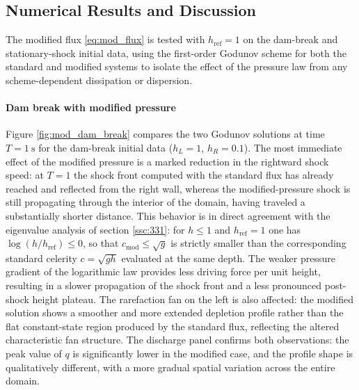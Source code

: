 

\subsection{Numerical Results and Discussion}
\label{ssc:332}

The modified flux \eqref{eq:mod_flux} is tested with \( h_{\mathrm{ref}} = 1 \) on the dam-break and stationary-shock initial data, using the first-order Godunov scheme for both the standard and modified systems to isolate the effect of the pressure law from any scheme-dependent dissipation or dispersion.

\paragraph{Dam break with modified pressure}
Figure \ref{fig:mod_dam_break} compares the two Godunov solutions at time \( T = \SI{1}{\second} \) for the dam-break initial data (\( h_L = 1 \), \( h_R = 0.1 \)). The most immediate effect of the modified pressure is a marked reduction in the rightward shock speed: at \( T = 1 \) the shock front computed with the standard flux has already reached and reflected from the right wall, whereas the modified-pressure shock is still propagating through the interior of the domain, having traveled a substantially shorter distance. This behavior is in direct agreement with the eigenvalue analysis of section \ref{ssc:331}: for \( h \leq 1 \) and \( h_{\mathrm{ref}} = 1 \) one has \( \log(h/h_{\mathrm{ref}}) \leq 0 \), so that \( c_{\mathrm{mod}} \leq \sqrt{g} \) is strictly smaller than the corresponding standard celerity \( c = \sqrt{gh} \) evaluated at the same depth. The weaker pressure gradient of the logarithmic law provides less driving force per unit height, resulting in a slower propagation of the shock front and a less pronounced post-shock height plateau. The rarefaction fan on the left is also affected: the modified solution shows a smoother and more extended depletion profile rather than the flat constant-state region produced by the standard flux, reflecting the altered characteristic fan structure. The discharge panel confirms both observations: the peak value of \( q \) is significantly lower in the modified case, and the profile shape is qualitatively different, with a more gradual spatial variation across the entire domain.

